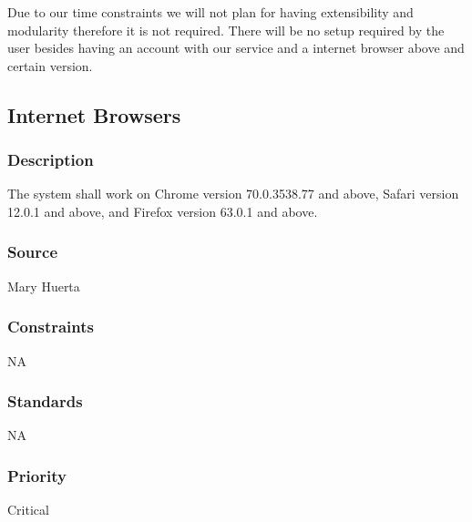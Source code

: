 Due to our time constraints we will not plan for having extensibility and modularity therefore it is not required. There will be no setup required by the user besides having an account with our service and a internet browser above and certain version.

\subsection{Internet Browsers}
\subsubsection{Description}
The system shall work on Chrome version 70.0.3538.77 and above, Safari version 12.0.1 and above, and Firefox version 
63.0.1 and above.
\subsubsection{Source}
Mary Huerta
\subsubsection{Constraints}
NA
\subsubsection{Standards}
NA
\subsubsection{Priority}
Critical